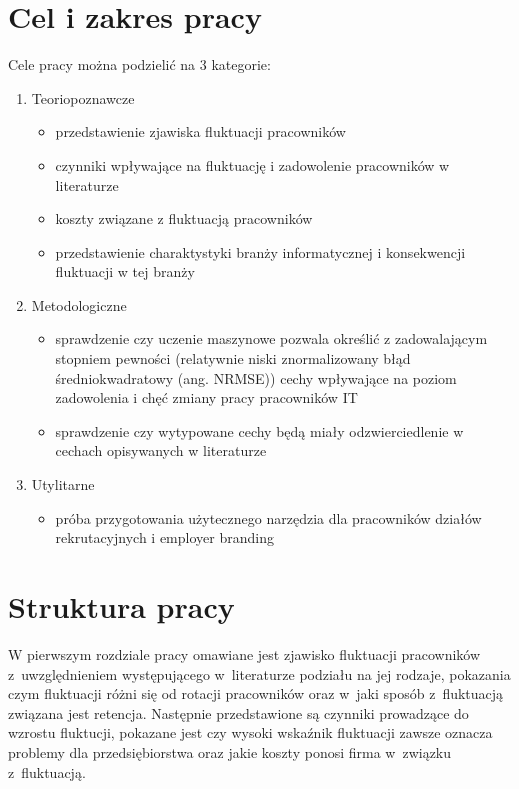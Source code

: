 \section*{Cel i zakres pracy}\label{sec:admission:thesis-goal}

Cele pracy można podzielić na 3 kategorie:
\begin{enumerate}
    \item Teoriopoznawcze
    \begin{itemize}
        \item przedstawienie zjawiska fluktuacji pracowników
        \item czynniki wpływające na fluktuację i zadowolenie pracowników w literaturze
        \item koszty związane z fluktuacją pracowników
        \item przedstawienie charaktystyki branży informatycznej i konsekwencji fluktuacji w tej branży
    \end{itemize}
    \item Metodologiczne
    \begin{itemize}
        \item sprawdzenie czy uczenie maszynowe pozwala określić z zadowalającym stopniem pewności (relatywnie niski znormalizowany błąd średniokwadratowy (ang. NRMSE)) cechy wpływające na poziom zadowolenia i chęć zmiany pracy pracowników IT
        \item sprawdzenie czy wytypowane cechy będą miały odzwierciedlenie w cechach opisywanych w literaturze
    \end{itemize}
    \item Utylitarne
    \begin{itemize}
        \item próba przygotowania użytecznego narzędzia dla pracowników działów rekrutacyjnych i employer branding
    \end{itemize}
\end{enumerate}

\section*{Struktura pracy}\label{sec:admission:thesis-structure}

W pierwszym rozdziale pracy omawiane jest zjawisko fluktuacji pracowników z~uwzględnieniem występującego w~literaturze podziału na jej rodzaje,
pokazania czym fluktuacji różni się od rotacji pracowników oraz w~jaki sposób z~fluktuacją związana jest retencja.
Następnie przedstawione są czynniki prowadzące do wzrostu fluktucji, pokazane jest czy wysoki wskaźnik fluktuacji zawsze oznacza problemy dla przedsiębiorstwa
oraz jakie koszty ponosi firma w~związku z~fluktuacją.

